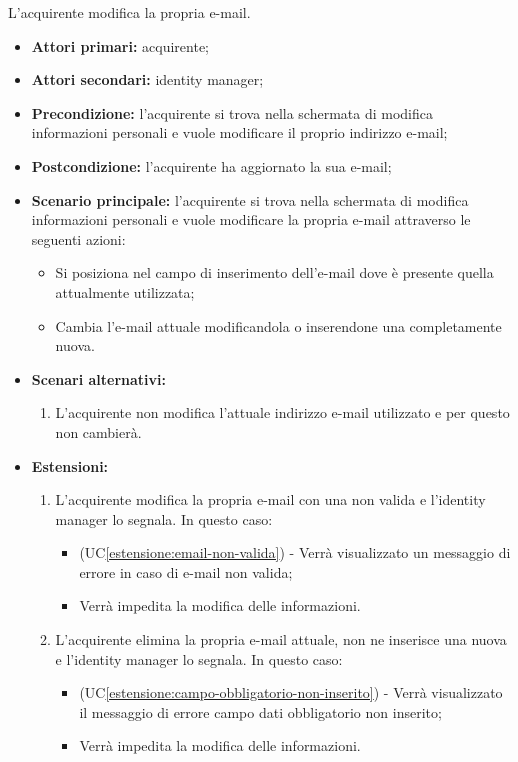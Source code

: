 L'acquirente modifica la propria e-mail.
\begin{itemize}
    \item \textbf{Attori primari:} acquirente;
    \item \textbf{Attori secondari:} identity manager;
    \item \textbf{Precondizione:} l'acquirente si trova nella schermata di modifica informazioni personali e vuole modificare il proprio indirizzo e-mail;
    \item \textbf{Postcondizione:} l'acquirente ha aggiornato la sua e-mail;
    \item \textbf{Scenario principale:} l'acquirente si trova nella schermata di modifica informazioni personali e vuole modificare la propria e-mail attraverso le seguenti azioni:
        \begin{itemize}
            \item Si posiziona nel campo di inserimento dell'e-mail dove è presente quella attualmente utilizzata;
            \item Cambia l'e-mail attuale modificandola o inserendone una completamente nuova.
        \end{itemize}
    \item \textbf{Scenari alternativi:} 
    \begin{enumerate}[label=\lett]
        \item L'acquirente non modifica l'attuale indirizzo e-mail utilizzato e per questo non cambierà.
    \end{enumerate}
    \item \textbf{Estensioni:} 
    \begin{enumerate}[label=\lett]
        \item L'acquirente modifica la propria e-mail con una non valida e l'identity manager lo segnala. In questo caso:
        \begin{itemize}
            \item (UC\ref{estensione:email-non-valida}) - Verrà visualizzato un messaggio di errore in caso di e-mail non valida;
            \item Verrà impedita la modifica delle informazioni.
        \end{itemize}
        \item L'acquirente elimina la propria e-mail attuale, non ne inserisce una nuova e l'identity manager lo segnala. In questo caso:
        \begin{itemize}
            \item (UC\ref{estensione:campo-obbligatorio-non-inserito}) - Verrà visualizzato il messaggio di errore campo dati obbligatorio non inserito;
            \item Verrà impedita la modifica delle informazioni.
        \end{itemize}
    \end{enumerate}
\end{itemize}

